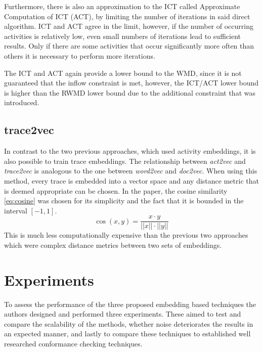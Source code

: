 \documentclass[runningheads]{template/llncs}
\begin{document}
Furthermore, there is also an approximation to the ICT called Approximate Computation of ICT (ACT), by limiting the number of iterations in said direct algorithm.
ICT and ACT agree in the limit, however, if the number of occurring activities is relatively low, even small numbers of iterations lead to sufficient results.
Only if there are some activities that occur significantly more often than others it is necessary to perform more iterations.

The ICT and ACT again provide a lower bound to the WMD, since it is not guaranteed that the inflow constraint is met, however, the ICT/ACT lower bound is higher than the RWMD lower bound due to the additional constraint that was introduced.

\subsection{trace2vec}
In contrast to the two previous approaches, which used activity embeddings, it is also possible to train trace embeddings.
The relationship between \emph{act2vec} and \emph{trace2vec} is analogous to the one between \emph{word2vec} and \emph{doc2vec}.
When using this method, every trace is embedded into a vector space and any distance metric that is deemed appropriate can be chosen.
In the paper, the cosine similarity \cref{eq:cosine} was chosen for its simplicity and the fact that it is bounded in the interval $[-1,1]$.
\begin{equation}
	\cos(x,  y) = \frac { x \cdot  y}{|| x|| \cdot || y||}
	\label{eq:cosine}
\end{equation}
This is much less computationally expensive than the previous two approaches which were complex distance metrics between two sets of embeddings.

\section{Experiments}
\label{sec:results}
To assess the performance of the three proposed embedding based techniques the authors designed and performed three experiments.
These aimed to test and compare the scalability of the methods, whether noise deteriorates the results in an expected manner, and lastly to compare these techniques to established well researched conformance checking techniques.
\end{document}
